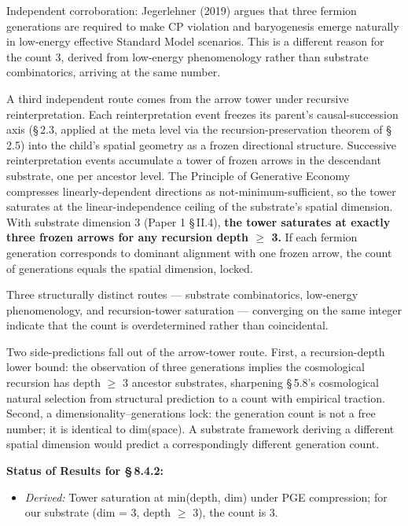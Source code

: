 \documentclass[11pt,oneside]{report}
\theoremstyle{definition}
\theoremstyle{remark}
\begin{document}
Independent corroboration: Jegerlehner (2019) argues that three fermion
generations are required to make CP violation and baryogenesis emerge
naturally in low-energy effective Standard Model scenarios. This is a
different reason for the count 3, derived from low-energy phenomenology
rather than substrate combinatorics, arriving at the same number.

A third independent route comes from the arrow tower under recursive
reinterpretation. Each reinterpretation event freezes its parent's
causal-succession axis (\S\,2.3, applied at the meta level via the
recursion-preservation theorem of \S\,2.5) into the child's spatial
geometry as a frozen directional structure. Successive reinterpretation
events accumulate a tower of frozen arrows in the descendant substrate,
one per ancestor level. The Principle of Generative Economy compresses
linearly-dependent directions as not-minimum-sufficient, so the tower
saturates at the linear-independence ceiling of the substrate's spatial
dimension. With substrate dimension 3 (Paper 1 \S\,II.4), \textbf{the tower
saturates at exactly three frozen arrows for any recursion depth \ensuremath{\geq} 3.}
If each fermion generation corresponds to dominant alignment with one
frozen arrow, the count of generations equals the spatial dimension,
locked.

Three structurally distinct routes --- substrate combinatorics,
low-energy phenomenology, and recursion-tower saturation --- converging
on the same integer indicate that the count is overdetermined rather
than coincidental.

Two side-predictions fall out of the arrow-tower route. First, a
recursion-depth lower bound: the observation of three generations
implies the cosmological recursion has depth \ensuremath{\geq} 3 ancestor substrates,
sharpening \S\,5.8's cosmological natural selection from structural
prediction to a count with empirical traction. Second, a
dimensionality--generations lock: the generation count is not a free
number; it is identical to dim(space). A substrate framework deriving a
different spatial dimension would predict a correspondingly different
generation count.

\textbf{Status of Results for \S\,8.4.2:}

\begin{itemize}
\item
  \emph{Derived:} Tower saturation at min(depth, dim) under PGE
  compression; for our substrate (dim = 3, depth \ensuremath{\geq} 3), the count is 3.
\end{itemize}
\end{document}

